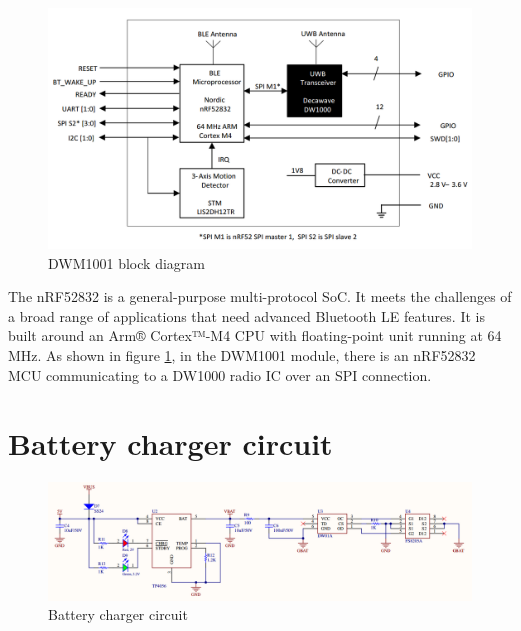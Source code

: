 \documentclass[\main/main.tex]{subfiles}
\begin{document}
\begin{figure}[H]
    \begin{center}
        \includegraphics[scale=0.35]{dwm1001_block_diagram.png}
    \end{center}
    \caption{DWM1001 block diagram}
    \label{fig:dwm1001_block_diagram}
\end{figure}

The nRF52832 is a general-purpose multi-protocol SoC. It meets the challenges of a broad range of applications that need advanced Bluetooth LE features. It is built around an Arm® Cortex™-M4 CPU with floating-point unit running at 64 MHz. As shown in figure \ref{fig:dwm1001_block_diagram}, in the DWM1001 module, there is an nRF52832 MCU communicating to  a DW1000 radio IC over an SPI connection.

\section{Battery charger circuit}

\begin{figure}[H]
    \begin{center}
        \includegraphics[width=1\textwidth]{battery_charger_circuit.png}
    \end{center}
    \caption{Battery charger circuit}
    \label{fig:battery_charger_circuit}
\end{figure}
\end{document}
